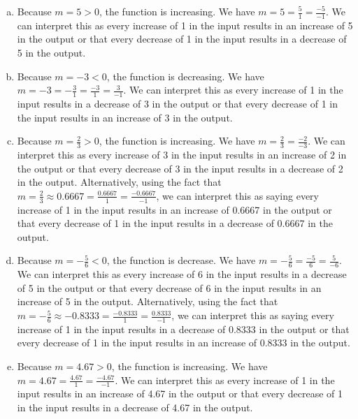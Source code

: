 \documentclass[11pt,letterpaper]{article}
\begin{document}
\sol
\begin{enumerate}[(a)]
\item Because $m= 5 > 0$, the function is increasing. We have $m= 5= \frac{5}{1}= \frac{-5}{-1}$. We can interpret this as every increase of 1 in the input results in an increase of 5 in the output or that every decrease of 1 in the input results in a decrease of 5 in the output. 
 
\item Because $m= -3 < 0$, the function is decreasing. We have $m= -3= -\frac{3}{1}= \frac{-3}{1}= \frac{3}{-1}$. We can interpret this as every increase of 1 in the input results in a decrease of 3 in the output or that every decrease of 1 in the input results in an increase of 3 in the output. 
 
\item Because $m= \frac{2}{3} > 0$, the function is increasing. We have $m= \frac{2}{3}= \frac{-2}{-3}$. We can interpret this as every increase of 3 in the input results in an increase of 2 in the output or that every decrease of 3 in the input results in a decrease of 2 in the output. Alternatively, using the fact that $m= \frac{2}{3} \approx 0.6667= \frac{0.6667}{1}= \frac{-0.6667}{-1}$, we can interpret this as saying every increase of 1 in the input results in an increase of 0.6667 in the output or that every decrease of 1 in the input results in a decrease of 0.6667 in the output. 
 
\item Because $m= -\frac{5}{6} < 0$, the function is decrease. We have $m= -\frac{5}{6}= \frac{-5}{6}= \frac{5}{-6}$. We can interpret this as every increase of 6 in the input results in a decrease of 5 in the output or that every decrease of 6 in the input results in an increase of 5 in the output. Alternatively, using the fact that $m= -\frac{5}{6} \approx -0.8333= \frac{-0.8333}{1}= \frac{0.8333}{-1}$, we can interpret this as saying every increase of 1 in the input results in a decrease of 0.8333 in the output or that every decrease of 1 in the input results in an increase of 0.8333 in the output. 
 
\item Because $m= 4.67 > 0$, the function is increasing. We have $m= 4.67= \frac{4.67}{1}= \frac{-4.67}{-1}$. We can interpret this as every increase of 1 in the input results in an increase of 4.67 in the output or that every decrease of 1 in the input results in a decrease of 4.67 in the output.  
\end{enumerate}
\end{document}
